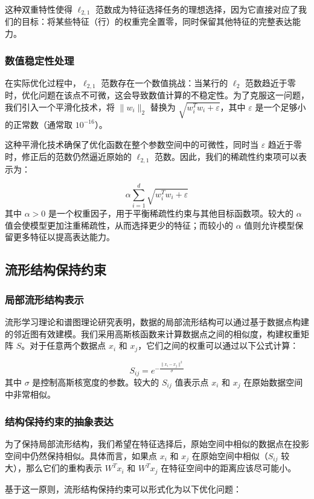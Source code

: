 \documentclass[12pt,a4paper,UTF8]{article}
\begin{document}
 这种双重特性使得 $\ell_{2,1}$ 范数成为特征选择任务的理想选择，因为它直接对应了我们的目标：将某些特征（行）的权重完全置零，同时保留其他特征的完整表达能力。
 
  \subsubsection{数值稳定性处理}
 在实际优化过程中，$\ell_{2,1}$ 范数存在一个数值挑战：当某行的 $\ell_2$ 范数趋近于零时，优化问题在该点不可微，这会导致数值计算的不稳定性。为了克服这一问题，我们引入一个平滑化技术，将 $\|w_i\|_2$ 替换为 $\sqrt{w_i^T w_i + \varepsilon}$，其中 $\varepsilon$ 是一个足够小的正常数（通常取 $10^{-16}$）。
 
 这种平滑化技术确保了优化函数在整个参数空间中的可微性，同时当 $\varepsilon$ 趋近于零时，修正后的范数仍然逼近原始的 $\ell_{2,1}$ 范数。因此，我们的稀疏性约束项可以表示为：
 
 $$
 \alpha\sum_{i=1}^{d}\sqrt{w_i^T w_i + \varepsilon}
 $$
 其中 $\alpha > 0$ 是一个权重因子，用于平衡稀疏性约束与其他目标函数项。较大的 $\alpha$ 值会使模型更加注重稀疏性，从而选择更少的特征；而较小的 $\alpha$ 值则允许模型保留更多特征以提高表达能力。
 
 \subsection{流形结构保持约束}
 \subsubsection{局部流形结构表示}
 流形学习理论和谱图理论研究表明，数据的局部流形结构可以通过基于数据点构建的邻近图有效建模。我们采用高斯核函数来计算数据点之间的相似度，构建权重矩阵 $S$。对于任意两个数据点 $x_i$ 和 $x_j$，它们之间的权重可以通过以下公式计算：
 
 $$
 S_{ij} = e^{-\frac{\|x_i - x_j\|^2}{\sigma}}
 $$
 其中 $\sigma$ 是控制高斯核宽度的参数。较大的 $S_{ij}$ 值表示点 $x_i$ 和 $x_j$ 在原始数据空间中非常相似。
 \subsubsection{结构保持约束的抽象表达} \label{332}
 为了保持局部流形结构，我们希望在特征选择后，原始空间中相似的数据点在投影空间中仍然保持相似。具体而言，如果点 $x_i$ 和 $x_j$ 在原始空间中相似（$S_{ij}$ 较大），那么它们的重构表示 $W^Tx_i$ 和 $W^Tx_j$ 在特征空间中的距离应该尽可能小。
 
 基于这一原则，流形结构保持约束可以形式化为以下优化问题：
 
\end{document}
